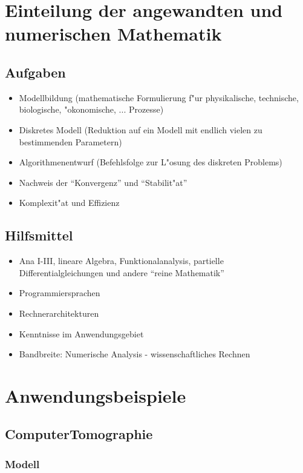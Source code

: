 \documentclass{scrartcl}
\begin{document}
\tableofcontents

\section*{Einteilung der angewandten und numerischen Mathematik}

\subsection{Aufgaben}

\begin{itemize}
\item Modellbildung (mathematische Formulierung f"ur physikalische, technische, biologische, "okonomische, ... Prozesse)
\item Diskretes Modell (Reduktion auf ein Modell mit endlich vielen zu bestimmenden Parametern)
\item Algorithmenentwurf (Befehlsfolge zur L"osung des diskreten Problems)
\item Nachweis der "`Konvergenz"' und "`Stabilit"at"'
\item Komplexit"at und Effizienz
\end{itemize}

\subsection{Hilfsmittel}
\begin{itemize}
\item Ana I-III, lineare Algebra, Funktionalanalysis, partielle Differentialgleichungen und andere "`reine Mathematik"'
\item Programmiersprachen
\item Rechnerarchitekturen
\item Kenntnisse im Anwendungsgebiet
\item Bandbreite: Numerische Analysis - wissenschaftliches Rechnen
\end{itemize}

\section{Anwendungsbeispiele}

\subsection{ComputerTomographie}

\subsubsection{Modell}
\end{document}
